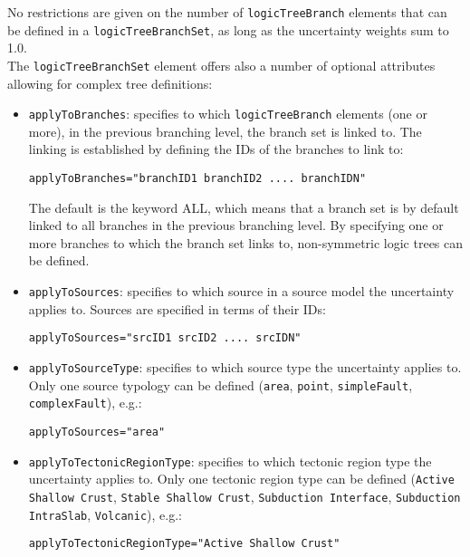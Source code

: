 No restrictions are given on the number of \Verb+logicTreeBranch+ elements that can be defined in a \Verb+logicTreeBranchSet+, as long as the uncertainty weights sum to 1.0.\\
The \Verb+logicTreeBranchSet+ element offers also a number of optional attributes allowing for complex tree definitions:
\begin{itemize}
\item \Verb+applyToBranches+: specifies to which \Verb+logicTreeBranch+ elements (one or more), in the previous branching level, the branch set is linked to. The linking is established by defining the IDs of the branches to link to:
\begin{Verbatim}[frame=single, commandchars=\\\{\}, samepage=true]
applyToBranches="branchID1 branchID2 .... branchIDN"
\end{Verbatim}
The default is the keyword ALL, which means that a branch set is by default linked to all branches in the previous branching level. By specifying one or more branches to which the branch set links to, non-symmetric logic trees can be defined.
\item \Verb+applyToSources+: specifies to which source in a source model the uncertainty applies to. Sources are specified in terms of their IDs:
\begin{Verbatim}[frame=single, commandchars=\\\{\}, samepage=true]
applyToSources="srcID1 srcID2 .... srcIDN"
\end{Verbatim}
\item \Verb+applyToSourceType+: specifies to which source type the uncertainty applies to.
Only one source typology can be defined (\Verb+area+, \Verb+point+, \Verb+simpleFault+, \Verb+complexFault+), e.g.:
\begin{Verbatim}[frame=single, commandchars=\\\{\}, samepage=true]
applyToSources="area"
\end{Verbatim}
\item \Verb+applyToTectonicRegionType+: specifies to which tectonic region type the uncertainty applies to. Only one tectonic region type can be defined (\Verb+Active Shallow Crust+, \Verb+Stable Shallow Crust+,  \Verb+Subduction Interface+, \Verb+Subduction IntraSlab+, \Verb+Volcanic+), e.g.:
\begin{Verbatim}[frame=single, commandchars=\\\{\}, samepage=true]
applyToTectonicRegionType="Active Shallow Crust"
\end{Verbatim}
\end{itemize}

